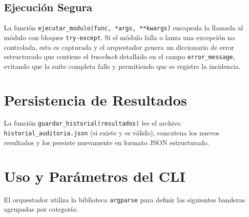 \documentclass[12pt,a4paper]{article}
\begin{document}
\subsection{Ejecución Segura}
La función \texttt{ejecutar\_modulo(func, *args, **kwargs)} encapsula la llamada al módulo con bloques \texttt{try-except}. Si el módulo falla o lanza una excepción no controlada, esta es capturada y el orquestador genera un diccionario de error estructurado que contiene el \textit{traceback} detallado en el campo \texttt{error\_message}, evitando que la suite completa falle y permitiendo que se registre la incidencia.

\section{Persistencia de Resultados}
La función \texttt{guardar\_historial(resultados)} lee el archivo \texttt{historial\_auditoria.json} (si existe y es válido), concatena los nuevos resultados y los persiste nuevamente en formato JSON estructurado.

\section{Uso y Parámetros del CLI}
El orquestador utiliza la biblioteca \texttt{argparse} para definir las siguientes banderas agrupadas por categoría:
\end{document}
